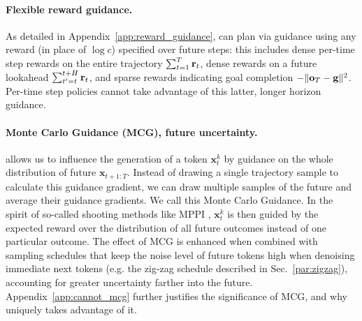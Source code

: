 \paragraph{Flexible reward guidance.} As detailed in Appendix~\ref{app:reward_guidance},
\algo{} can plan via guidance using any reward (in place of $\log c$) specified over future steps: this includes dense per-time step rewards on the entire trajectory $\sum_{t=1}^T \mathbf{r}_t$, dense rewards on a future lookahead $\sum_{t'=t}^{t+H}\mathbf{r}_t$, and sparse rewards indicating goal completion $-\|\mathbf{o}_T-\mathbf{g}\|^2$. Per-time step policies cannot take advantage of this latter, longer horizon guidance. 














  



\paragraph{Monte Carlo Guidance (MCG), future uncertainty.}
\algoseq{} allows us to influence the generation of a token $\mathbf{x}_t^k$ by guidance on the whole distribution of future $\mathbf{x}_{t+1:T}$. Instead of drawing a single trajectory sample to calculate this guidance gradient, we can draw multiple samples of the future and average their guidance gradients. We call this Monte Carlo Guidance. In the spirit of so-called shooting methods like MPPI \cite{ williams2015model}, $\mathbf{x}_t^k$ is then guided by the expected reward over the distribution of all future outcomes instead of one particular outcome.  The effect of MCG is enhanced when combined with sampling schedules that keep the noise level of future tokens high when denoising immediate next tokens (e.g. the zig-zag schedule described in Sec.~\ref{par:zigzag}), accounting for greater uncertainty farther into the future. Appendix~\ref{app:cannot_mcg} further justifies the significance of MCG, and why \algo{}  uniquely takes  advantage of it.






